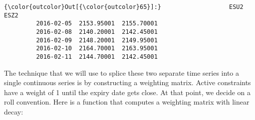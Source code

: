 \documentclass{article}
\begin{document}
            \begin{Verbatim}[commandchars=\\\{\}]
{\color{outcolor}Out[{\color{outcolor}65}]:}                   ESU2        ESZ2
         2016-02-05  2153.95001  2155.70001
         2016-02-08  2140.20001  2142.45001
         2016-02-09  2148.20001  2149.95001
         2016-02-10  2164.70001  2163.95001
         2016-02-11  2144.70001  2142.45001
\end{Verbatim}
        
    The technique that we will use to splice these two separate time series
into a single continuous series is by constructing a weighting matrix.
Active constraints have a weight of 1 until the expiry date gets close.
At that point, we decide on a roll convention. Here is a function that
computes a weighting matrix with linear decay:
\end{document}

